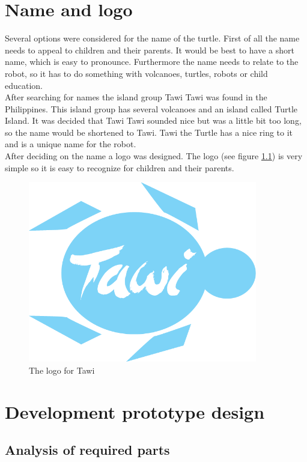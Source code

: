 \documentclass[11pt,twoside,a4paper]{report}
\begin{document}
\chapter{Name and logo}
Several options were considered for the name of the turtle. First of all the name needs to appeal to children and their parents. It would be best to have a short name, which is easy to pronounce. Furthermore the name needs to relate to the robot, so it has to do something with volcanoes, turtles, robots or child education.\\ 
After searching for names the island group Tawi Tawi was found in the Philippines. This island group has several volcanoes and an island called Turtle Island. It was decided that Tawi Tawi sounded nice but was a little bit too long, so the name would be shortened to Tawi. Tawi the Turtle has a nice ring to it and is a unique name for the robot.\\ 
After deciding on the name a logo was designed. The logo (see figure \ref{fig:logo}) is very simple so it is easy to recognize for children and their parents.
\begin{figure}[H]
\begin{center}
\includegraphics[width = 10cm]{Images/logo_Tawi.png}
\caption{The logo for Tawi}
\label{fig:logo}
\end{center}
\end{figure}

\chapter{Development prototype design}

\section{Analysis of required parts}
\end{document}

